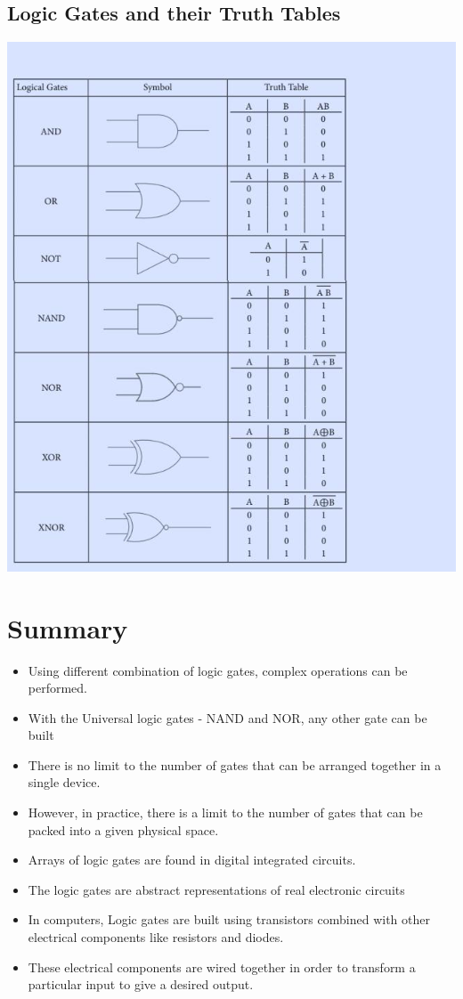 \documentclass[10pt,a4paper,onecolumn]{article}
\begin{document}
\subsection{Logic Gates and their Truth Tables}
\includegraphics{gst23}

\section{Summary}
\begin{itemize}
	\item Using different combination of logic gates, complex operations can be performed. 
	\item With the Universal logic gates - NAND and NOR, any other gate can be built
	\item There is no limit to the number of gates that can be arranged together in a single device. 
	\item However, in practice, there is a limit to the number of gates that can be packed into a given physical space. 
	\item Arrays of logic gates are found in digital integrated circuits.
	\item The logic gates are abstract representations of real electronic circuits
	\item In computers, Logic gates are built using transistors combined with other electrical components like resistors and diodes. 
	\item These electrical components are wired together in order to transform a particular input to give a desired output. \cite{mygst108}
\end{itemize}
\end{document}
